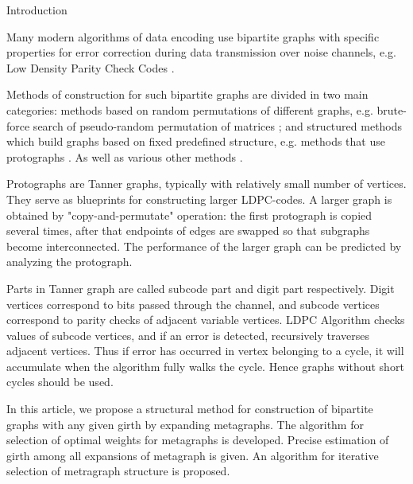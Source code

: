 \documentclass[leqno]{aadmbook}
\begin{document}
\vspace{1.5cc}
\begin{section}
{Introduction}

Many modern algorithms of data encoding use bipartite graphs with specific properties for error correction during data transmission over noise channels, e.g. Low Density Parity Check Codes \cite{johnson} \cite{ldpc_encoding}. 

Methods of construction for such bipartite graphs are divided in two main categories: methods based on random permutations of different graphs, e.g. brute-force search of pseudo-random permutation of matrices \cite{gallager}; and structured methods which build graphs based on fixed predefined structure, e.g. methods that use protographs \cite{protographs}. As well as various other methods
\cite{algebraic_aproach_to_sc_ldpc, imrich_construction, lifts_of_graphs, Kim2002ExplicitCO, margulis_critique, margulis_construction, vasic_combinatorial_construction}.

Protographs are Tanner graphs, typically with relatively small number of vertices. They serve as blueprints for constructing larger LDPC-codes. A larger graph is obtained by "copy-and-permutate" operation: the first protograph is copied several times, after that endpoints of edges are swapped so that subgraphs become interconnected. The performance of the larger graph can be predicted by analyzing the protograph. 

Parts in Tanner graph are called subcode part and digit part respectively. Digit vertices correspond to bits passed through the channel, and subcode vertices correspond to parity checks of adjacent variable vertices. LDPC Algorithm checks values of subcode vertices, and if an error is detected, recursively traverses adjacent vertices. Thus if error has occurred in vertex belonging to a cycle, it will accumulate when the algorithm fully walks the cycle. Hence graphs without short cycles should be used.

In this article, we propose a structural method for construction of bipartite graphs with any given girth by expanding metagraphs. The algorithm for selection of optimal weights for metagraphs is developed. Precise estimation of girth among all expansions of metagraph is given. An algorithm for iterative selection of metragraph structure is proposed.

\end{section}
\end{document}

